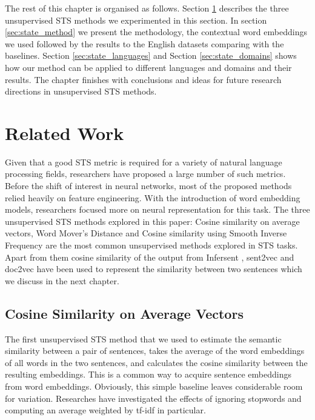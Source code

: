 The rest of this chapter is organised as follows. Section \ref{sec:state_related} describes the three unsupervised STS methods we experimented in this section. In section \ref{sec:state_method} we present the methodology, the contextual word embeddings we used followed by the results to the English datasets comparing with the baselines. Section \ref{sec:state_languages} and Section \ref{sec:state_domains} shows how our method can be applied to different languages and domains and their results. The chapter finishes with conclusions and ideas for future research directions in unsupervised STS methods.


\section{Related Work}
\label{sec:state_related}
Given that a good STS metric is required for a variety of natural language processing fields, researchers have proposed a large number of such metrics. Before the shift of interest in neural networks, most of the proposed methods relied heavily on feature engineering. With the introduction of word embedding models, researchers focused more on neural representation for this task. The three unsupervised STS methods explored in this paper: Cosine similarity on average vectors, Word Mover's Distance and Cosine similarity using Smooth Inverse Frequency are the most common unsupervised methods explored in STS tasks. Apart from them cosine similarity of the output from Infersent \cite{Conneau2017SupervisedLO}, sent2vec \cite{Pagliardini2018UnsupervisedLO} and doc2vec \cite{Le2014DistributedRO} have been used to represent the similarity between two sentences which we discuss in the next chapter. 


\subsection{Cosine Similarity on Average Vectors}
The first unsupervised STS method that we used to estimate the semantic similarity between a pair of sentences, takes the average of the word embeddings of all words in the two sentences, and calculates the cosine similarity between the resulting embeddings. This is a common way to acquire sentence embeddings from word embeddings. Obviously, this simple baseline leaves considerable room for variation. Researches have investigated the effects of ignoring stopwords and computing an average weighted by tf-idf in particular.

